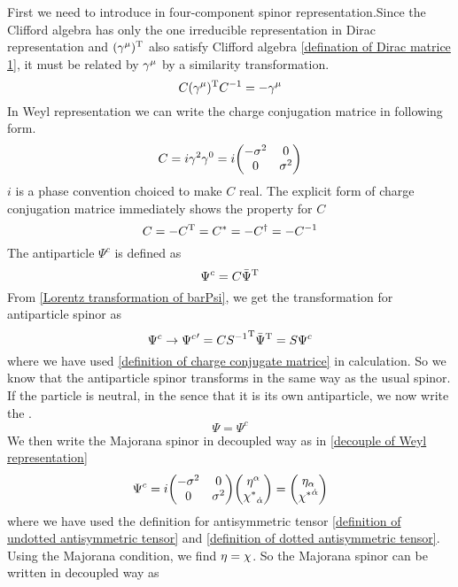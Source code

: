 First we need to introduce  in four-component spinor representation.Since the Clifford algebra has only the one irreducible representation in Dirac representation and $(\gamma^{\mu})^{\text{T}}$ also satisfy Clifford algebra \eqref{defination of Dirac matrice 1}, it must be related by $\gamma^{\mu}$ by a similarity transformation. 
\begin{equation}\label{definition of charge conjugate matrice}
  C (\gamma^{\mu})^{\text{T}} C^{-1} = -\gamma^{\mu}
\end{equation}
In Weyl representation we can write the charge conjugation matrice in following form.
\begin{equation}
C = i \g^2\g^0 
= i\mqty(-\s^{2} & 0    \\
          0      & \s^{2})
\end{equation}
$i$ is a phase convention choiced to make $C$ real. The explicit form of charge conjugation matrice immediately shows the property for $C$
\begin{equation}
C = - C^{\text{T}} = C^{*} = -C^{\dagger} = -C^{-1}
\end{equation}
The antiparticle $\Psi^{c}$ is defined as
\begin{equation}
\Psi^{c} = C \bar{\Psi}^{\text{T}}
\end{equation}
From \eqref{Lorentz transformation of barPsi}, we get the transformation for antiparticle spinor as
\begin{equation}
\Psi^{c} \rightarrow {\Psi^{c}}' = C {S^{-1}}^{\text{T}} {\bar\Psi}^{\text{T}}
 =S \Psi^{c}
\end{equation}
where we have used \eqref{definition of charge conjugate matrice} in calculation. So we know that the antiparticle spinor transforms in the same way as the usual spinor. If the particle is neutral, in the sence that it is its own antiparticle, we now write the .
\begin{equation}\label{Majorana condition}
 \Psi = \Psi^{c}
\end{equation}
We then write the Majorana spinor in decoupled way as in \eqref{decouple of Weyl representation} 
\begin{equation}
\Psi^{c} = i\mqty(-\s^{2} & 0    \\
           0      & \s^{2})
           \mqty(\h^{\a}  \\  \lc_{\doa})
         = \mqty(\h_{\a} \\ \lc^{\doa})
\end{equation}
where we have used the definition for antisymmetric tensor \eqref{definition of undotted antisymmetric tensor} and \eqref{definition of dotted antisymmetric tensor}. Using the Majorana condition, we find $\eta = \chi$. So the Majorana spinor can be written in decoupled way as
